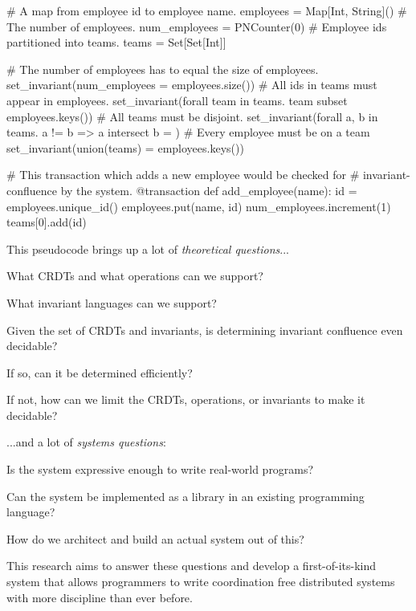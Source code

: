 \begin{Python}
# A map from employee id to employee name.
employees = Map[Int, String]()
# The number of employees.
num_employees = PNCounter(0)
# Employee ids partitioned into teams.
teams = Set[Set[Int]]

# The number of employees has to equal the size of employees.
set_invariant(num_employees = employees.size())
# All ids in teams must appear in employees.
set_invariant(forall team in teams. team subset employees.keys())
# All teams must be disjoint.
set_invariant(forall a, b in teams. a != b => a intersect b = {})
# Every employee must be on a team
set_invariant(union(teams) = employees.keys())

# This transaction which adds a new employee would be checked for
# invariant-confluence by the system.
@transaction
def add_employee(name):
  id = employees.unique_id()
  employees.put(name, id)
  num_employees.increment(1)
  teams[0].add(id)
\end{Python}

This pseudocode brings up a lot of \emph{theoretical questions}...
\begin{inparaitem}
  \item What CRDTs and what operations can we support?
  \item What invariant languages can we support?
  \item Given the set of CRDTs and invariants, is determining invariant
    confluence even decidable?
  \item If so, can it be determined efficiently?
  \item If not, how can we limit the CRDTs, operations, or invariants to make
    it decidable?
\end{inparaitem}
...and a lot of \emph{systems questions}:
\begin{inparaitem}
  \item Is the system expressive enough to write real-world programs?
  \item Can the system be implemented as a library in an existing programming
    language?
  \item How do we architect and build an actual system out of this?
\end{inparaitem}

This research aims to answer these questions and develop a first-of-its-kind
system that allows programmers to write coordination free distributed systems
with more discipline than ever before.
